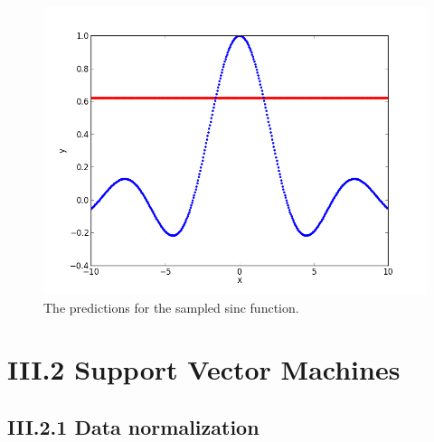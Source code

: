 \documentclass[12pt]{article}
\begin{document}
    \begin{figure}[h]
      \centering
      \includegraphics[width =1\textwidth]{figures/function1_1_and_prediction.png}
      \caption{The predictions for the sampled sinc function.}
      \label{figure:predictions2}
    \end{figure}




\section*{III.2 Support Vector Machines}

  \subsection*{III.2.1 Data normalization}
\end{document}
